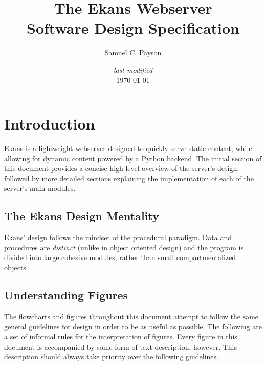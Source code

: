 \documentclass[11pt]{article}
\title{The Ekans Webserver \\ {\small\textbf{Software Design Specification}}}
\author {Samuel C. Payson}
\date{{\footnotesize \emph{last modified\\}}\today}
\begin{document}
\maketitle
\thispagestyle{empty}
\pagebreak
\pagestyle{fancy}
\setcounter{page}{1}
\tableofcontents
\pagebreak
\setcounter{page}{1}
\section{Introduction}
Ekans is a lightweight webserver designed to quickly serve static content, while allowing for dynamic content powered by a Python backend. The initial section of this document provides a concise high-level overview of the server's design, followed by more detailed sections explaining the implementation of each of the server's main modules.
\subsection{The Ekans Design Mentality}
Ekans' design follows the mindset of the procedural paradigm. Data and procedures are \emph{distinct} (unlike in object oriented design) and the program is divided into large cohesive modules, rather than small compartmentalized objects.



\subsection{Understanding Figures}
The flowcharts and figures throughout this document attempt to follow the same general guidelines for design in order to be as useful as possible. The following are a set of informal rules for the interpretation of figures. Every figure in this document is accompanied by some form of text description, however. This description should always take priority over the following guidelines.
\end{document}
